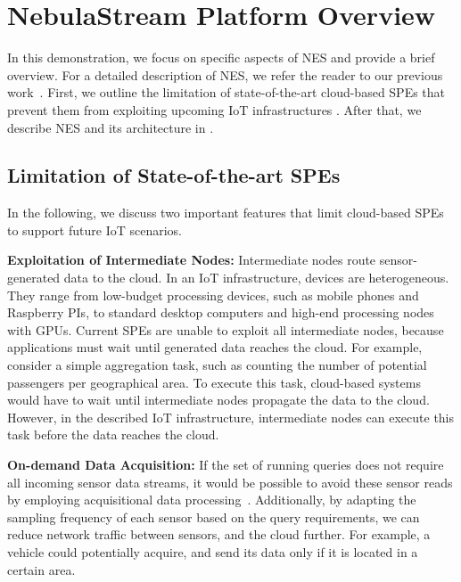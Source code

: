 \section{NebulaStream Platform Overview}
\label{nes}
In this demonstration, we focus on specific aspects of NES and provide a brief overview.
For a detailed description of NES, we refer the reader to our previous work~\cite{nes}.  
First, we outline the limitation of state-of-the-art cloud-based SPEs that prevent them from exploiting upcoming IoT infrastructures .
After that, we describe NES and its architecture in .
% 
\subsection{Limitation of State-of-the-art SPEs}
\label{adapting}
In the following, we discuss two important features that limit cloud-based SPEs to support future IoT scenarios.

\textbf{Exploitation of Intermediate Nodes:}
Intermediate nodes route sensor-generated data to the cloud.
In an IoT infrastructure, devices are heterogeneous. They range from low-budget processing devices, such as mobile phones and Raspberry PIs, to standard desktop computers and high-end processing nodes with GPUs. 
Current SPEs are unable to exploit all intermediate nodes, because applications must wait until generated data reaches the cloud. 
For example, consider a simple aggregation task, such as counting the number of potential passengers per geographical area. To execute this task, cloud-based systems would have to wait until intermediate nodes propagate the data to the cloud. However, in the described IoT infrastructure, intermediate nodes can execute this task before the data reaches the cloud.

\textbf{On-demand Data Acquisition:}
If the set of running queries does not require all incoming sensor data streams, it would be possible to avoid these sensor reads by employing acquisitional data processing~\cite{tinydb}. 
Additionally, by adapting the sampling frequency of each sensor based on the query requirements, we can reduce network traffic between sensors, and the cloud further.
For example, a vehicle could potentially acquire, and send its data only if it is located in a certain area.


